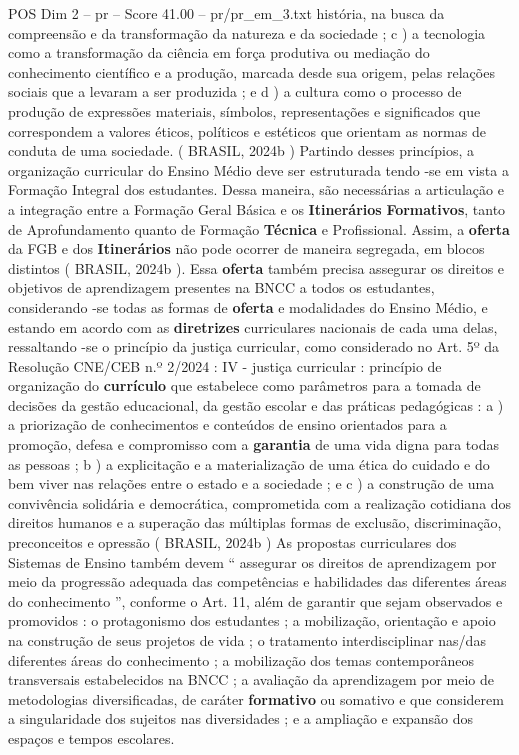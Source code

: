 \begin{textsample}{POS Dim 2 – pr – Score 41.00 – pr/pr\_em\_3.txt}
história, na busca da compreensão e da transformação da natureza e da sociedade ; c ) a tecnologia como a transformação da ciência em força produtiva ou mediação do conhecimento científico e a produção, marcada desde sua origem, pelas relações sociais que a levaram a ser produzida ; e d ) a cultura como o processo de produção de expressões materiais, símbolos, representações e significados que correspondem a valores éticos, políticos e estéticos que orientam as normas de conduta de uma sociedade. ( BRASIL, 2024b ) Partindo desses princípios, a organização curricular do Ensino Médio deve ser estruturada tendo -se em vista a Formação Integral dos estudantes.
Dessa maneira, são necessárias a articulação e a integração entre a Formação Geral Básica e os \textbf{Itinerários} \textbf{Formativos}, tanto de Aprofundamento quanto de Formação \textbf{Técnica} e Profissional.
Assim, a \textbf{oferta} da FGB e dos \textbf{Itinerários} não pode ocorrer de maneira segregada, em blocos distintos ( BRASIL, 2024b ).
Essa \textbf{oferta} também precisa assegurar os direitos e objetivos de aprendizagem presentes na BNCC a todos os estudantes, considerando -se todas as formas de \textbf{oferta} e modalidades do Ensino Médio, e estando em acordo com as \textbf{diretrizes} curriculares nacionais de cada uma delas, ressaltando -se o princípio da justiça curricular, como considerado no Art. 5º da Resolução CNE/CEB n.º 2/2024 : IV - justiça curricular : princípio de organização do \textbf{currículo} que estabelece como parâmetros para a tomada de decisões da gestão educacional, da gestão escolar e das práticas pedagógicas : a ) a priorização de conhecimentos e conteúdos de ensino orientados para a promoção, defesa e compromisso com a \textbf{garantia} de uma vida digna para todas as pessoas ; b ) a explicitação e a materialização de uma ética do cuidado e do bem viver nas relações entre o estado e a sociedade ; e c ) a construção de uma convivência solidária e democrática, comprometida com a realização cotidiana dos direitos humanos e a superação das múltiplas formas de exclusão, discriminação, preconceitos e opressão ( BRASIL, 2024b ) As propostas curriculares dos Sistemas de Ensino também devem “ assegurar os direitos de aprendizagem por meio da progressão adequada das competências e habilidades das diferentes áreas do conhecimento ”, conforme o Art. 11, além de garantir que sejam observados e promovidos : o protagonismo dos estudantes ; a mobilização, orientação e apoio na construção de seus projetos de vida ; o tratamento interdisciplinar nas/das diferentes áreas do conhecimento ; a mobilização dos temas contemporâneos transversais estabelecidos na BNCC ; a avaliação da aprendizagem por meio de metodologias diversificadas, de caráter \textbf{formativo} ou somativo e que considerem a singularidade dos sujeitos nas diversidades ; e a ampliação e expansão dos espaços e tempos escolares.

\end{textsample}
